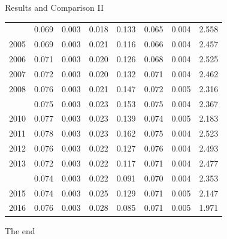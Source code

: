 \documentclass[10pt,ignorenonframetext,]{beamer}
\begin{document}
\begin{frame}{Results and Comparison II}
\begin{longtable}{rrrrrrrl}
\addlinespace
2004 & 0.069 & 0.003 & 0.018 & 0.133 & 0.065 & 0.004 & 2.558\\
2005 & 0.069 & 0.003 & 0.021 & 0.116 & 0.066 & 0.004 & 2.457\\
2006 & 0.071 & 0.003 & 0.020 & 0.126 & 0.068 & 0.004 & 2.525\\
2007 & 0.072 & 0.003 & 0.020 & 0.132 & 0.071 & 0.004 & 2.462\\
2008 & 0.076 & 0.003 & 0.021 & 0.147 & 0.072 & 0.005 & 2.316\\
\addlinespace
2009 & 0.075 & 0.003 & 0.023 & 0.153 & 0.075 & 0.004 & 2.367\\
2010 & 0.077 & 0.003 & 0.023 & 0.139 & 0.074 & 0.005 & 2.183\\
2011 & 0.078 & 0.003 & 0.023 & 0.162 & 0.075 & 0.004 & 2.523\\
2012 & 0.076 & 0.003 & 0.022 & 0.127 & 0.076 & 0.004 & 2.493\\
2013 & 0.072 & 0.003 & 0.022 & 0.117 & 0.071 & 0.004 & 2.477\\
\addlinespace
2014 & 0.074 & 0.003 & 0.022 & 0.091 & 0.070 & 0.004 & 2.353\\
2015 & 0.074 & 0.003 & 0.025 & 0.129 & 0.071 & 0.005 & 2.147\\
2016 & 0.076 & 0.003 & 0.028 & 0.085 & 0.071 & 0.005 & 1.971\\*
\end{longtable}\endgroup{}

\end{frame}

\begin{frame}[allowframebreaks]{The end}
\protect\hypertarget{the-end}{}

\end{frame}
\end{document}
